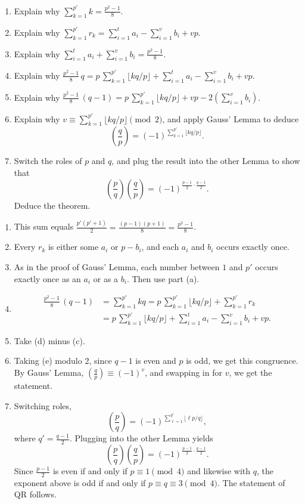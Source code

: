 \documentclass[12pt]{amsart}
\newcommand{\solution}[1]{\ifthenelse {\equal{\displaysol}{1}} {\begin{framed}{\color{meretale}\noindent #1}\end{framed}} { \ }}
\begin{document}
\begin{enumerate}
\begin{enumerate}
\item Explain why $\sum_{k=1}^{p'} k = \frac{p^2 -1}{8}$.
\item Explain why $\sum_{k=1}^{p'} r_k = \sum_{i=1}^t a_i -  \sum_{i=1}^v b_i + v p$.
\item Explain why $\sum_{i=1}^t a_i  +  \sum_{i=1}^v b_i = \frac{p^2 -1}{8}$.
\item Explain why $\frac{p^2 -1}{8} \, q = p \, \sum_{k=1}^{p'} \lfloor kq / p\rfloor + \sum_{i=1}^t a_i -  \sum_{i=1}^v b_i + v p$.
\item Explain why $\frac{p^2 -1}{8} \, (q-1) = p\,  \sum_{k=1}^{p'} \lfloor kq / p\rfloor + v p - 2\left(\sum_{i=1}^v b_i\right)$.
\item Explain why $v\equiv \sum_{k=1}^{p'} \lfloor kq / p\rfloor \pmod{2}$, and apply Gauss' Lemma to deduce 
\[ \left( \frac{q}{p} \right) = (-1)^{\sum_{k=1}^{p'} \lfloor kq / p\rfloor}.\]
\item Switch the roles of $p$ and $q$, and plug the result into the other Lemma to show that
\[ \left(\frac{p}{q}\right) \left(\frac{q}{p}\right) = (-1)^{\frac{p-1}{2} \cdot \frac{q-1}{2}}.\]
Deduce the theorem.
\end{enumerate}


\solution{
\begin{enumerate}
\item This sum equals $\frac{p' (p'+1)}{2} = \frac{(p-1)(p+1)}{8} = \frac{p^2-1}{8}$.
\item Every $r_k$ is either some $a_i$ or $p-b_i$, and each $a_i$ and $b_i$ occurs exactly once.
\item As in the proof of Gauss' Lemma, each number between $1$ and $p'$ occurs exactly once as an $a_i$ or as a $b_i$. Then use part (a).

\item \[ \begin{aligned} \frac{p^2 -1}{8} \, (q-1) &= \sum_{k=1}^{p'} kq = p \, \sum_{k=1}^{p'}  \lfloor kq / p\rfloor + \sum_{k=1}^{p'} r_k \\&= p \, \sum_{k=1}^{p'} \lfloor kq / p\rfloor + \sum_{i=1}^t a_i -  \sum_{i=1}^v b_i + v p.\end{aligned}\]
\item Take (d) minus (c).
\item Taking (e) modulo 2, since $q-1$ is even and $p$ is odd, we get this congruence. 
By Gauss' Lemma, $\left( \frac{q}{p} \right)\equiv (-1)^v$, and swapping in for $v$, we get the statement.
\item Switching roles, 
\[ \left( \frac{p}{q} \right) = (-1)^{\sum_{\ell=1}^{q'} \lfloor \ell p / q\rfloor},\]
where $q' = \frac{q-1}{2}$.
Plugging  into the other Lemma yields
\[ \left(\frac{p}{q}\right) \left(\frac{q}{p}\right) = (-1)^{\frac{p-1}{2} \cdot \frac{q-1}{2}}.\]
Since $\frac{p-1}{2}$ is even if and only if $p\equiv 1 \pmod{4}$ and likewise with $q$, the exponent above is odd if and only if $p\equiv q \equiv 3 \pmod 4$. The statement of QR follows.
\end{enumerate}
}




\end{enumerate}
\end{document}
